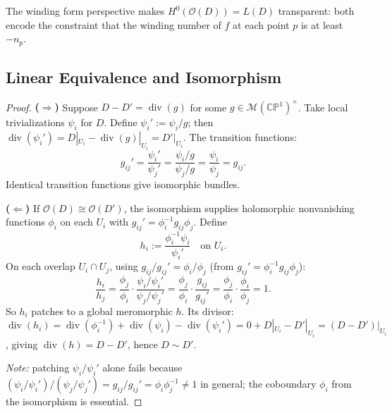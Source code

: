 \documentclass[11pt,openany]{article}
\newenvironment{infobox}{%
  \def\FrameCommand{\fboxrule=0.8pt \fboxsep=8pt \colorbox{noteblue}}%
  \MakeFramed{\advance\hsize-\width \FrameRestore}}{\endMakeFramed}
\newcommand{\CP}{\mathbb{CP}}
\newcommand{\CPone}{\CP^1}
\newcommand{\MM}{\mathcal{M}}
\renewcommand{\div}{\operatorname{div}}
\begin{document}
\begin{infobox}
The winding form perspective makes $H^0(\mathcal{O}(D))=L(D)$ transparent: both
encode the constraint that the winding number of $f$ at each point $p$ is at
least $-n_p$.
\end{infobox}

\subsection{Linear Equivalence and Isomorphism}
\label{subsec:lineq}


\begin{proof}
\textbf{($\Rightarrow$)}
Suppose $D-D'=\div(g)$ for some $g\in\MM(\CPone)^\times$.
Take local trivializations $\psi_i$ for $D$.
Define $\psi_i':=\psi_i/g$; then
$\div(\psi_i')=D|_{U_i}-\div(g)|_{U_i}=D'|_{U_i}$.
The transition functions:
\[
  g_{ij}' = \frac{\psi_i'}{\psi_j'}
  = \frac{\psi_i/g}{\psi_j/g} = \frac{\psi_i}{\psi_j} = g_{ij}.
\]
Identical transition functions give isomorphic bundles.

\textbf{($\Leftarrow$)}
If $\mathcal{O}(D)\cong\mathcal{O}(D')$, the isomorphism supplies holomorphic nonvanishing
functions $\phi_i$ on each $U_i$ with $g_{ij}'=\phi_i^{-1}g_{ij}\phi_j$.
Define
\[
  h_i := \frac{\phi_i^{-1}\psi_i}{\psi_i'}\quad\text{on }U_i.
\]
On each overlap $U_i\cap U_j$, using $g_{ij}/g_{ij}'=\phi_i/\phi_j$
(from $g_{ij}'=\phi_i^{-1}g_{ij}\phi_j$):
\[
  \frac{h_i}{h_j}
  = \frac{\phi_j}{\phi_i}\cdot\frac{\psi_i/\psi_i'}{\psi_j/\psi_j'}
  = \frac{\phi_j}{\phi_i}\cdot\frac{g_{ij}}{g_{ij}'}
  = \frac{\phi_j}{\phi_i}\cdot\frac{\phi_i}{\phi_j}
  = 1.
\]
So $h_i$ patches to a global meromorphic $h$.
Its divisor: $\div(h_i)=\div(\phi_i^{-1})+\div(\psi_i)-\div(\psi_i')
=0+D|_{U_i}-D'|_{U_i}=(D-D')|_{U_i}$, giving $\div(h)=D-D'$, hence $D\sim D'$.

\medskip\noindent
\textit{Note:} patching $\psi_i/\psi_i'$ alone fails because
$(\psi_i/\psi_i')/(\psi_j/\psi_j')=g_{ij}/g_{ij}'=\phi_i\phi_j^{-1}\neq 1$ in general;
the coboundary $\phi_i$ from the isomorphism is essential.
\end{proof}

\end{document}
